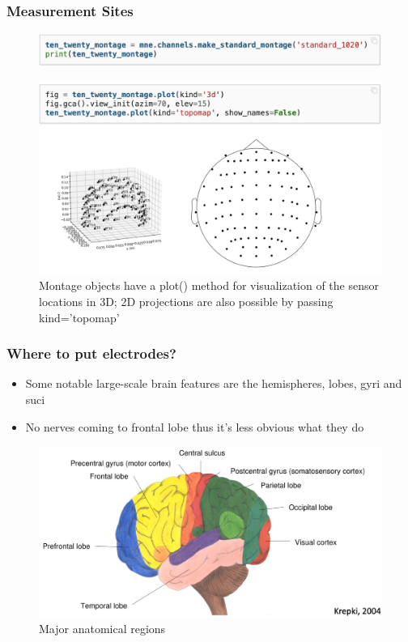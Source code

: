 \documentclass{beamer}
\begin{document}
\begin{frame}
\frametitle{Measurement Sites}
	\begin{figure}
		\includegraphics[width=0.7\linewidth]{image/montage}
	\end{figure}
		\begin{figure}
		\includegraphics[width=0.7\linewidth]{image/montage2}
		\caption{Montage objects have a plot() method for visualization of the sensor locations in 3D; 2D projections are also possible by passing kind='topomap'}
	\end{figure}
\end{frame}

\begin{frame}
\frametitle{Where to put electrodes?}
\begin{itemize}
	\item Some notable large-scale brain features are the hemispheres, lobes, gyri and suci
	\item No nerves coming to frontal lobe thus it's less obvious what they do
\end{itemize}
	\begin{figure}
		\includegraphics[width=0.7\linewidth]{image/structure}
		\caption{Major anatomical regions}
	\end{figure}
\end{frame}
\end{document}
